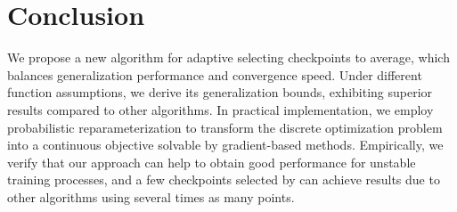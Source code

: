 \section{Conclusion}
\label{sec:Con}
We propose a new algorithm \method{} for adaptive selecting checkpoints to average, which balances generalization performance and convergence speed. Under different function assumptions, we derive its generalization bounds, exhibiting superior results compared to other algorithms. In practical implementation, we employ probabilistic reparameterization to transform the discrete optimization problem into a continuous objective solvable by gradient-based methods. Empirically, we verify that our approach can help to obtain good performance for unstable training processes, and a few checkpoints selected by \method{} can achieve results due to other algorithms using several times as many points. 